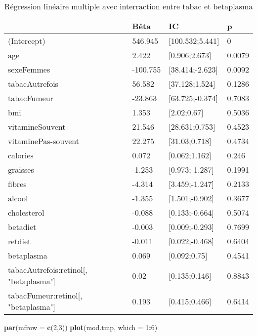 \documentclass[]{article}
\newenvironment{Shaded}{\begin{snugshade}}{\end{snugshade}}
\newcommand{\KeywordTok}[1]{\textcolor[rgb]{0.13,0.29,0.53}{\textbf{#1}}}
\newcommand{\DataTypeTok}[1]{\textcolor[rgb]{0.13,0.29,0.53}{#1}}
\newcommand{\DecValTok}[1]{\textcolor[rgb]{0.00,0.00,0.81}{#1}}
\newcommand{\OperatorTok}[1]{\textcolor[rgb]{0.81,0.36,0.00}{\textbf{#1}}}
\newcommand{\NormalTok}[1]{#1}
\begin{document}
\begin{table}

\caption{\label{tab:unnamed-chunk-71}Régression linéaire multiple avec interraction entre tabac et betaplasma}
\centering
\begin{tabular}[t]{l|l|l|l}
\hline
  & Bêta & IC & p\\
\hline
\rowcolor[HTML]{BBD2E1}  (Intercept) & 546.945 & [100.532;5.441] & 0\\
\hline
age & 2.422 & [0.906;2.673] & 0.0079\\
\hline
\rowcolor[HTML]{BBD2E1}  sexeFemmes & -100.755 & [38.414;-2.623] & 0.0092\\
\hline
tabacAutrefois & 56.582 & [37.128;1.524] & 0.1286\\
\hline
\rowcolor[HTML]{BBD2E1}  tabacFumeur & -23.863 & [63.725;-0.374] & 0.7083\\
\hline
bmi & 1.353 & [2.02;0.67] & 0.5036\\
\hline
\rowcolor[HTML]{BBD2E1}  vitamineSouvent & 21.546 & [28.631;0.753] & 0.4523\\
\hline
vitaminePas-souvent & 22.275 & [31.03;0.718] & 0.4734\\
\hline
\rowcolor[HTML]{BBD2E1}  calories & 0.072 & [0.062;1.162] & 0.246\\
\hline
graisses & -1.253 & [0.973;-1.287] & 0.1991\\
\hline
\rowcolor[HTML]{BBD2E1}  fibres & -4.314 & [3.459;-1.247] & 0.2133\\
\hline
alcool & -1.355 & [1.501;-0.902] & 0.3677\\
\hline
\rowcolor[HTML]{BBD2E1}  cholesterol & -0.088 & [0.133;-0.664] & 0.5074\\
\hline
betadiet & -0.003 & [0.009;-0.293] & 0.7699\\
\hline
\rowcolor[HTML]{BBD2E1}  retdiet & -0.011 & [0.022;-0.468] & 0.6404\\
\hline
betaplasma & 0.069 & [0.092;0.75] & 0.4541\\
\hline
\rowcolor[HTML]{BBD2E1}  tabacAutrefois:retinol[, "betaplasma"] & 0.02 & [0.135;0.146] & 0.8843\\
\hline
tabacFumeur:retinol[, "betaplasma"] & 0.193 & [0.415;0.466] & 0.6414\\
\hline
\end{tabular}
\end{table}

\begin{Shaded}
\begin{Highlighting}[]
\KeywordTok{par}\NormalTok{(}\DataTypeTok{mfrow =} \KeywordTok{c}\NormalTok{(}\DecValTok{2}\NormalTok{,}\DecValTok{3}\NormalTok{))}
\KeywordTok{plot}\NormalTok{(mod.tmp, }\DataTypeTok{which =} \DecValTok{1}\OperatorTok{:}\DecValTok{6}\NormalTok{)}
\end{Highlighting}
\end{Shaded}
\end{document}
